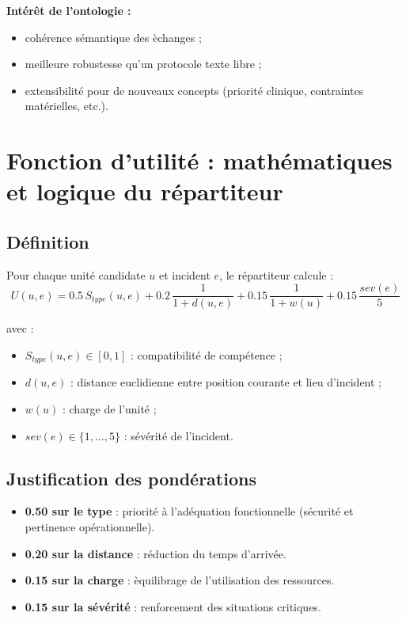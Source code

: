 \documentclass[12pt,a4paper]{article}
\begin{document}
\textbf{Int\'er\^et de l'ontologie :}
\begin{itemize}
    \item coh\'erence s\'emantique des \`echanges ;
    \item meilleure robustesse qu'un protocole texte libre ;
    \item extensibilit\'e pour de nouveaux concepts (priorit\'e clinique, contraintes mat\'erielles, etc.).
\end{itemize}

\section{Fonction d'utilit\'e : math\'ematiques et logique du r\'epartiteur}
\subsection{D\'efinition}
Pour chaque unit\'e candidate $u$ et incident $e$, le r\'epartiteur calcule :
\[
U(u,e) = 0.5\,S_{type}(u,e)
+ 0.2\,\frac{1}{1+d(u,e)}
+ 0.15\,\frac{1}{1+w(u)}
+ 0.15\,\frac{sev(e)}{5}
\]

avec :
\begin{itemize}
    \item $S_{type}(u,e) \in [0,1]$ : compatibilit\'e de comp\'etence ;
    \item $d(u,e)$ : distance euclidienne entre position courante et lieu d'incident ;
    \item $w(u)$ : charge de l'unit\'e ;
    \item $sev(e) \in \{1,\dots,5\}$ : s\'ev\'erit\'e de l'incident.
\end{itemize}

\subsection{Justification des pond\'erations}
\begin{itemize}
    \item \textbf{0.50 sur le type} : priorit\'e \`a l'ad\'equation fonctionnelle (s\'ecurit\'e et pertinence op\'erationnelle).
    \item \textbf{0.20 sur la distance} : r\'eduction du temps d'arriv\'ee.
    \item \textbf{0.15 sur la charge} : \`equilibrage de l'utilisation des ressources.
    \item \textbf{0.15 sur la s\'ev\'erit\'e} : renforcement des situations critiques.
\end{itemize}
\end{document}

